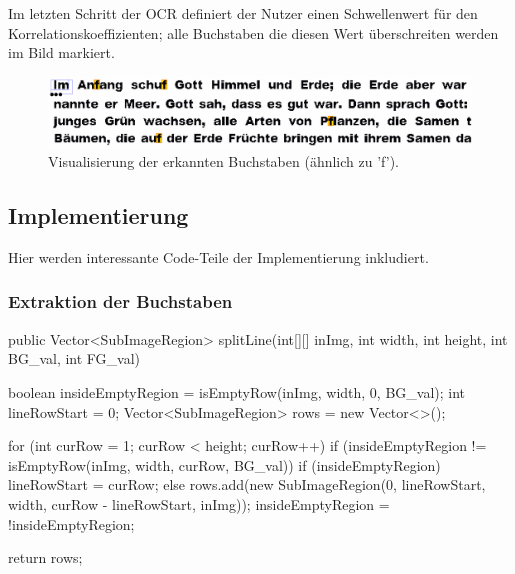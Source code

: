 \documentclass[german,notitlepage,smartquotes]{hgbreport}
\begin{document}
Im letzten Schritt der OCR definiert der Nutzer einen Schwellenwert für den Korrelationskoeffizienten; alle Buchstaben die diesen Wert überschreiten werden im Bild markiert.

\begin{figure}[h]
\centering
\includegraphics[width=.85\textwidth]{recognized_chars}
\caption{Visualisierung der erkannten Buchstaben (ähnlich zu 'f').}
\label{fig:recognized_chars}
\end{figure}

\subsection{Implementierung}

Hier werden interessante Code-Teile der Implementierung inkludiert.

\subsubsection{Extraktion der Buchstaben}

\begin{program}
\caption{\texttt{splitLine(...)}}
\label{prog:extract-01}
\begin{JavaCode}
public Vector<SubImageRegion> splitLine(int[][] inImg, int width, int height, int BG_val, int FG_val) {
	boolean insideEmptyRegion = isEmptyRow(inImg, width, 0, BG_val);
	int lineRowStart = 0;
	Vector<SubImageRegion> rows = new Vector<>();

	for (int curRow = 1; curRow < height; curRow++) {
		if (insideEmptyRegion != isEmptyRow(inImg, width, curRow, BG_val)) {
			if (insideEmptyRegion) {
				lineRowStart = curRow;
			} else {
				rows.add(new SubImageRegion(0, lineRowStart, width, curRow - lineRowStart, inImg));
			}
			insideEmptyRegion = !insideEmptyRegion;
		}
	}

	return rows;
}
\end{JavaCode}
\end{program}
\end{document}
